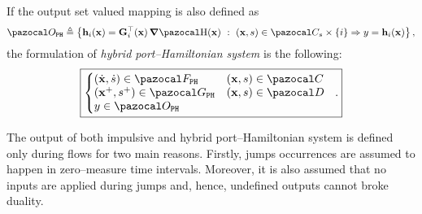 If the output set valued mapping is also defined as
%
\begin{equation}
    \Oo_{\tt PH} \triangleq \left\{\mathbf{h}_i(\xb) = \mathbf{G}_i^\top(\xb)\dH(\xb)~:~(\xb,s) \in\C_s\times\{i\}\Rightarrow y=\mathbf{h}_i(\xb)\right\},
\end{equation}
%
the formulation of \textit{hybrid port--Hamiltonian system} is the following:
%
\begin{equation}\label{eq:hph}
    \boxed{
    \left\{
        \begin{matrix*}[l]
            (\dot{\xb},\dot{s}) \in \F_{\tt PH} & (\xb,s)\in\C\\
            (\xb^+,s^+) \in \G_{\tt PH} & (\xb,s)\in\D\\
            y \in \Oo_{\tt PH}
        \end{matrix*}
    \right.~~.
    }
\end{equation}
%
\begin{rem}
	The output of both impulsive and  hybrid port--Hamiltonian system is defined only during flows for two main reasons. Firstly, jumps occurrences are assumed to happen in zero--measure time intervals. Moreover, it is also assumed that no inputs are applied during jumps and, hence, undefined outputs cannot broke duality.
\end{rem}
%
